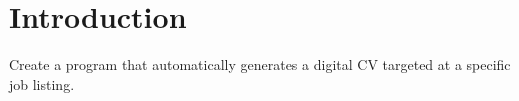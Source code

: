 \section{Introduction}\label{sec:introduction}

Create a program that automatically generates a digital CV targeted at a specific job listing.
